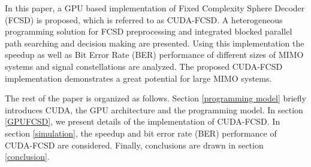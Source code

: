 \documentclass[letterpaper, 10pt, conference]{ieeeconf}
\begin{document}
In this paper, a GPU based implementation of Fixed Complexity Sphere Decoder (FCSD) is proposed, which is referred to as CUDA-FCSD. A heterogeneous programming solution for FCSD preprocessing and integrated blocked parallel path searching and decision making are presented. Using this implementation the speedup as well as Bit Error Rate (BER) performance of different sizes of MIMO systems and signal constellations are analyzed. The proposed CUDA-FCSD implementation demonstrates a great potential for large MIMO systems.

The rest of the paper is organized as follows. Section \ref{programming model} briefly introduces CUDA, the GPU architecture and the programming model. In section \ref{GPUFCSD}, we present details of the implementation of CUDA-FCSD. In section \ref{simulation}, the speedup and bit error rate (BER) performance of CUDA-FCSD are considered. Finally, conclusions are drawn in section \ref{conclusion}.    

%
%



%
%
\end{document}
